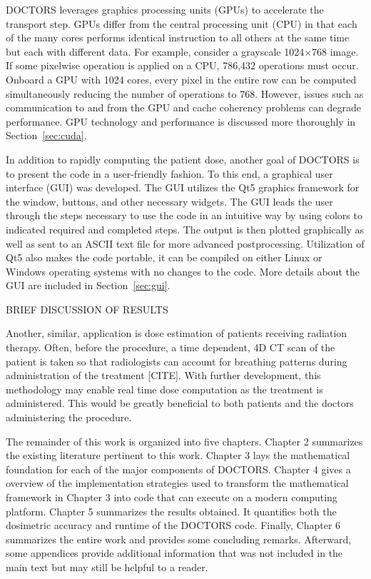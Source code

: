DOCTORS leverages graphics processing units (GPUs) to accelerate the transport step. GPUs differ from the central processing unit (CPU) in that each of the many cores performs identical instruction to all others at the same time but each with different data. For example, consider a grayscale 1024$\times$768 image. If some pixelwise operation is applied on a CPU, 786,432 operations must occur. Onboard a GPU with 1024 cores, every pixel in the entire row can be computed simultaneously reducing the number of operations to 768. However, issues such as communication to and from the GPU and cache coherency problems can degrade performance. GPU technology and performance is discussed more thoroughly in Section~\ref{sec:cuda}.

In addition to rapidly computing the patient dose, another goal of DOCTORS is to present the code in a user-friendly fashion. To this end, a graphical user interface (GUI) was developed. The GUI utilizes the Qt5 graphics framework for the window, buttons, and other necessary widgets. The GUI leads the user through the steps necessary to use the code in an intuitive way by using colors to indicated required and completed steps. The output is then plotted graphically as well as sent to an ASCII text file for more advanced postprocessing. Utilization of Qt5 also makes the code portable, it can be compiled on either Linux or Windows operating systems with no changes to the code. More details about the GUI are included in Section~\ref{sec:gui}.

BRIEF DISCUSSION OF RESULTS

Another, similar, application is dose estimation of patients receiving radiation therapy. Often, before the procedure, a time dependent, 4D CT scan of the patient is taken so that radiologists can account for breathing patterns during administration of the treatment [CITE]. With further development, this methodology may enable real time dose computation as the treatment is administered. This would be greatly beneficial to both patients and the doctors administering the procedure.

The remainder of this work is organized into five chapters. Chapter 2 summarizes the existing literature pertinent to this work. Chapter 3 lays the mathematical foundation for each of the major components of DOCTORS. Chapter 4 gives a overview of the implementation strategies used to transform the mathematical framework in Chapter 3 into code that can execute on a modern computing platform. Chapter 5 summarizes the results obtained. It quantifies both the dosimetric accuracy and runtime of the DOCTORS code. Finally, Chapter 6 summarizes the entire work and provides some concluding remarks. Afterward, some appendices provide additional information that was not included in the main text but may still be helpful to a reader. 

\endinput
